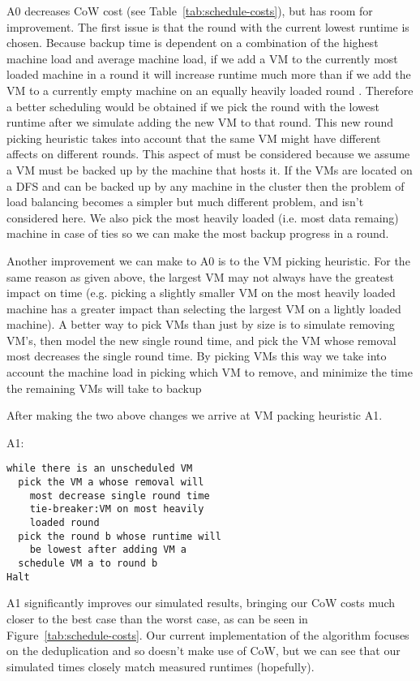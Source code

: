 A0 decreases CoW cost (see Table~\ref{tab:schedule-costs}), but has room for
improvement. The first issue is that the round with the current lowest runtime
is chosen.  Because backup time is dependent on a combination of the highest
machine load and average machine load, if we add a VM to the currently most
loaded machine in a round it will increase runtime much more than if we add the
VM to a currently empty machine on an equally heavily loaded round
. Therefore a better scheduling
would be obtained if we pick the round with the lowest runtime after we
simulate adding the new VM to that round. This new round picking heuristic
takes into account that the same VM might have different affects on different
rounds. This aspect of must be considered because we assume a VM must be backed
up by the machine that hosts it. If the VMs are located on a DFS and can be
backed up by any machine in the cluster then the problem of load balancing
becomes a simpler but much different problem, and isn't considered here. We
also pick the most heavily loaded (i.e. most data remaing) machine in case of
ties so we can make the most backup progress in a round.

Another improvement we can make to A0 is to the VM picking heuristic. For the
same reason as given above, the largest VM may not always have the greatest
impact on time (e.g. picking a slightly smaller VM on the most heavily loaded
machine has a greater impact than selecting the largest VM on a lightly loaded
machine). A better way to pick VMs than just by size is to simulate removing
VM's, then model the new single round time, and pick the VM whose removal most
decreases the single round time. By picking VMs this way we take into account
the machine load in picking which VM to remove, and minimize the time the
remaining VMs will take to backup

After making the two above changes we arrive at VM packing heuristic A1.

A1:
\begin{lstlisting}
while there is an unscheduled VM
  pick the VM a whose removal will
    most decrease single round time
    tie-breaker:VM on most heavily
    loaded round
  pick the round b whose runtime will
    be lowest after adding VM a
  schedule VM a to round b
Halt
\end{lstlisting}

A1 significantly improves our simulated results, bringing our CoW costs much
closer to the best case than the worst case, as can be seen in
Figure~\ref{tab:schedule-costs}.  Our current implementation of the algorithm
focuses on the deduplication and so doesn't make use of CoW, but we can see
that our simulated times closely match measured runtimes (hopefully). 
